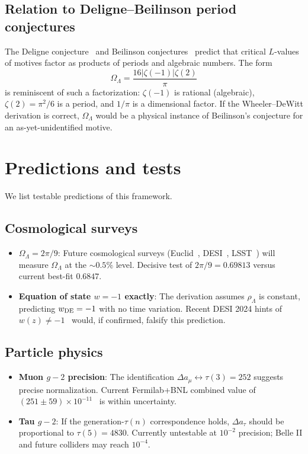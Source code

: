 \documentclass[11pt,a4paper]{article}
\begin{document}
\subsection{Relation to Deligne--Beilinson period conjectures}

The Deligne conjecture~\cite{Deligne1979} and Beilinson
conjectures~\cite{Beilinson1984} predict that critical $L$-values of
motives factor as products of periods and algebraic numbers. The form
\begin{equation}
\Omega_\Lambda = \frac{16|\zeta(-1)|\zeta(2)}{\pi}
\end{equation}
is reminiscent of such a factorization: $\zeta(-1)$ is rational
(algebraic), $\zeta(2) = \pi^2/6$ is a period, and $1/\pi$ is
a dimensional factor. If the Wheeler--DeWitt derivation is correct,
$\Omega_\Lambda$ would be a physical instance of Beilinson's
conjecture for an as-yet-unidentified motive.

\section{Predictions and tests}
\label{sec:predictions}

We list testable predictions of this framework.

\subsection{Cosmological surveys}

\begin{itemize}
\item \textbf{$\Omega_\Lambda = 2\pi/9$}: Future cosmological surveys
(Euclid~\cite{Euclid}, DESI~\cite{DESI}, LSST~\cite{LSST}) will
measure $\Omega_\Lambda$ at the $\sim 0.5\%$ level. Decisive test of
$2\pi/9 = 0.69813$ versus current best-fit $0.6847$.

\item \textbf{Equation of state $w = -1$ exactly}: The derivation
assumes $\rho_\Lambda$ is constant, predicting $w_{\rm DE} = -1$
with no time variation. Recent DESI 2024 hints of
$w(z) \neq -1$~\cite{DESI2024} would, if confirmed, falsify
this prediction.
\end{itemize}

\subsection{Particle physics}

\begin{itemize}
\item \textbf{Muon $g-2$ precision}: The identification
$\Delta a_\mu \leftrightarrow \tau(3) = 252$ suggests precise
normalization. Current Fermilab+BNL combined value of
$(251 \pm 59)\times 10^{-11}$~\cite{MuonG2FNAL} is within
uncertainty.

\item \textbf{Tau $g-2$}: If the generation-$\tau(n)$ correspondence
holds, $\Delta a_\tau$ should be proportional to $\tau(5) = 4830$.
Currently untestable at $10^{-2}$ precision; Belle II and future
colliders may reach $10^{-4}$.
\end{itemize}
\end{document}
